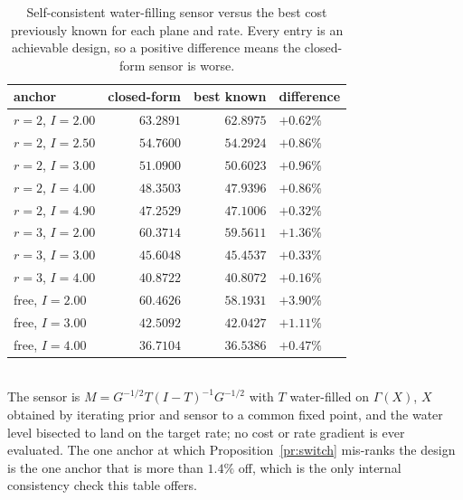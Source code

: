 \begin{table}[h]
 \centering\caption{Self-consistent water-filling sensor versus the best cost
 previously known for each plane and rate. Every entry is an achievable design,
 so a positive difference means the closed-form sensor is worse.}
 \label{tab:wfdesign}
 \begin{tabularx}{\columnwidth}{Xrrl}
 \hline
 anchor & closed-form & best known & difference \\
 \hline
 $r=2$, $I=2.00$ & $63.2891$ & $62.8975$ & $+0.62\%$ \\
 $r=2$, $I=2.50$ & $54.7600$ & $54.2924$ & $+0.86\%$ \\
 $r=2$, $I=3.00$ & $51.0900$ & $50.6023$ & $+0.96\%$ \\
 $r=2$, $I=4.00$ & $48.3503$ & $47.9396$ & $+0.86\%$ \\
 $r=2$, $I=4.90$ & $47.2529$ & $47.1006$ & $+0.32\%$ \\
 $r=3$, $I=2.00$ & $60.3714$ & $59.5611$ & $+1.36\%$ \\
 $r=3$, $I=3.00$ & $45.6048$ & $45.4537$ & $+0.33\%$ \\
 $r=3$, $I=4.00$ & $40.8722$ & $40.8072$ & $+0.16\%$ \\
 free, $I=2.00$ & $60.4626$ & $58.1931$ & $+3.90\%$ \\
 free, $I=3.00$ & $42.5092$ & $42.0427$ & $+1.11\%$ \\
 free, $I=4.00$ & $36.7104$ & $36.5386$ & $+0.47\%$ \\
 \hline
 \end{tabularx}
 \\[1pt]{\scriptsize The sensor is $M=G^{-1/2}T(I-T)^{-1}G^{-1/2}$ with $T$
 water-filled on $\Gamma(X)$, $X$ obtained by iterating prior and sensor to a
 common fixed point, and the water level bisected to land on the target rate;
 no cost or rate gradient is ever evaluated. The one anchor at which
 Proposition~\ref{pr:switch} mis-ranks the design is the one anchor that is
 more than $1.4\%$ off, which is the only internal consistency check this table
 offers. }
\end{table}

